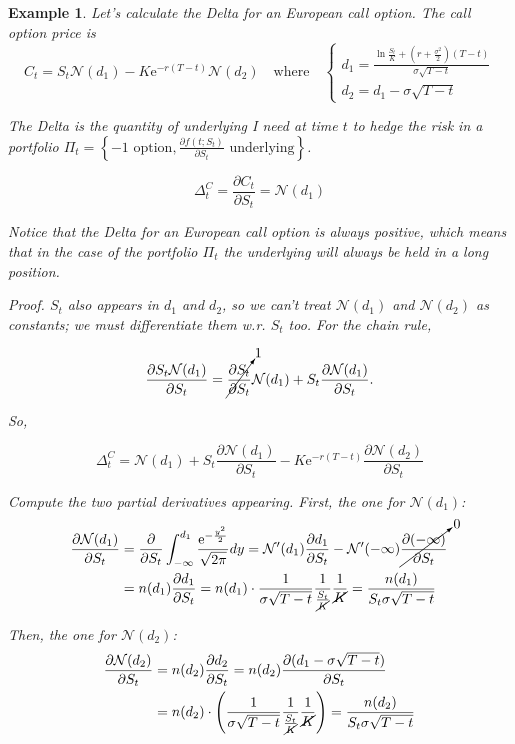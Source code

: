 \documentclass[oneside,titlepage,headinclude,12pt,a4paper,BCOR5mm,footinclude]{book}
\theoremstyle{defn}
\newtheorem{example}{Example}
\newcommand{\eexp}{\mathrm{e}}
\newcommand\NN{\mathcal{N}}
\newcommand\de\partial
\begin{document}
\begin{example} 
  Let's calculate the Delta for an European call option. The call option price is
  \[
    C_t = S_t \mathcal{N}(d_1) - K\eexp^{-r(T-t)}\mathcal{N}(d_2)
    \quad
    \text{where} \quad
    \left\{ \begin{array}{c}
        d_1 = \frac{
          \ln\frac{S_t}{K} + \left(r + \frac{\sigma^2}{2}\right)(T-t)
        }{\sigma\sqrt{T-t}} \\
        d_2 = d_1 - \sigma\sqrt{T-t}
      \end{array}
  \]

  The Delta is the  quantity of underlying I need at time $t$  to hedge the risk
  in a  portfolio $\Pi_t  = \left\{ -1  \text{ option},  \frac{\de f(t;S_t)}{\de
  S_t} \text{ underlying}\right\} $.

  \[
    \Delta^C_t = \frac{\de C_t}{\de S_t} = \mathcal{N}(d_1)
  \]

  Notice that  the Delta for an  European call option is  always positive, which
  means that in the case of the  portfolio $\Pi_t$ the underlying will always be
  held in a long position.

  \textit{Proof.}  $S_t$ also  appears in  $d_1$ and  $d_2$, so  we can't  treat
  $\mathcal{N}(d_1)$ and $\mathcal{N}(d_2)$ as  constants; we must differentiate
  them w.r. $S_t$ too. For the chain rule,
  
  \[
    \frac{\de S_t\mathcal{N}(d_1)}{\de S_t} = \cancelto{1}{\frac{\de
    S_t}{\de S_t}} \mathcal{N}(d_1) + S_t \frac{\de \mathcal{N}(d_1)}{\de S_t}.
  \]

  So,

  \[
    \Delta^C_t = \mathcal{N}(d_1) + S_t\frac{\de \mathcal{N}(d_1)}{\de S_t} - K\eexp^{-r(T-t)} \frac{\de \mathcal{N}(d_2)}{\de S_t} 
  \]
  
  Compute the two partial derivatives appearing. First, the one for $\NN(d_1)$:
  \begin{align*}
    \frac{\de \NN(d_1)}{\de S_t} &= \frac{\de}{\de S_t} \int_{-\infty}^{d_1} \frac{\eexp^{-\frac{y^2}{2}}}{\sqrt{2\pi}} dy
    = \NN'(d_1) \frac{\de d_1}{\de S_t} - \NN'(-\infty)\cancelto{0}{\frac{\de (-\infty)}{\de S_t}}
    \\&= n(d_1)\frac{\de d_1}{\de S_t} = n(d_1) \cdot \frac{1}{\sigma\sqrt{T-t}}\frac{1}{\frac{S_t}{\cancel{K}}} \frac{1}{\cancel{K}}
    = \frac{n(d_1)}{S_t\sigma\sqrt{T-t}}
  \end{align*}

  Then, the one for $\NN(d_2)$:
  \begin{align*}
    \frac{\de \NN(d_2)}{\de S_t} &= n(d_2)\frac{\de d_2}{\de S_t} = n(d_2)\frac{\de (d_1 - \sigma\sqrt{T-t})}{\de S_t}
    \\&= n(d_2) \cdot \left( \frac{1}{\sigma\sqrt{T-t}} \frac{1}{\frac{S_t}{\cancel{K}}} \frac{1}{\cancel{K}} \right)
    = \frac{n(d_2)}{S_t\sigma\sqrt{T-t}}
  \end{align*}


\end{example}
\end{document}
